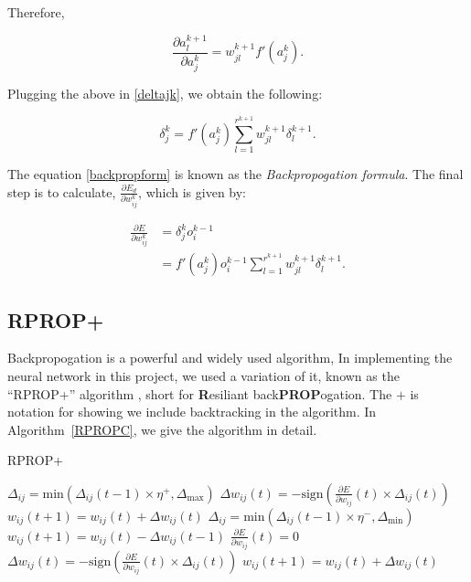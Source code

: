 Therefore,

\begin{equation}
    \frac{\partial a_l^{k+1}}{\partial a_j^k} = w_{jl}^{k+1}f'(a_j^k).
\end{equation}

Plugging the above in \ref{deltajk}, we obtain the following:

\begin{equation}
    \label{backpropform}
    \delta_j^k = f'(a_j^k)\sum^{r^{k+1}}_{l=1}w_{jl}^{k+1}\delta_l^{k+1}.
\end{equation}

The equation \ref{backpropform} is known as the \textit{Backpropogation formula}. The final step is to calculate, $\frac{\partial E_d}{\partial w_{ij}^k}$, which is given by:

\begin{align}
        \frac{\partial E}{\partial w_{ij}^k} &= \delta^k_jo_i^{k-1} \\
        &=f'(a_j^k)o^{k-1}_i \sum^{r^{k+1}}_{l=1}w_{jl}^{k+1}\delta_l^{k+1}.
\end{align}

\subsection{RPROP+}
Backpropogation is a powerful and widely used algorithm, In implementing the neural network in this project, we used a variation of it, known as 
the ``RPROP+'' algorithm \cite{rprop}, short for \textbf{R}esiliant back\textbf{PROP}ogation. The $+$ is notation for showing we include backtracking in the algorithm. In Algorithm~\ref{RPROPC}, 
we give the algorithm in detail. 

\begin{algorithm}[h]
    \caption{RPROP+}\label{RPROPC}
\begin{algorithmic}[1]
    \State $\Delta_{ij} = \text{min} (\Delta_{ij}(t-1)\times \eta^{+},\Delta_{\text{max}})$ 
    \State $\Delta w_{ij}(t) = -\text{sign}\left(\frac{\partial E}{\partial w_{ij}}(t) \times \Delta_{ij}(t)\right)$
    \State $w_{ij}(t+1) = w_{ij}(t) + \Delta w_{ij}(t)$
    \State $\Delta_{ij} = \text{min} (\Delta_{ij}(t-1)\times \eta^{-},\Delta_{\text{min}})$ 
    \State $w_{ij}(t+1) = w_{ij}(t) - \Delta w_{ij}(t-1)$
    \State $\frac{\partial E}{\partial w_{ij}}(t) = 0 $
    \State $\Delta w_{ij}(t) = -\text{sign}\left(\frac{\partial E}{\partial w_{ij}}(t) \times \Delta_{ij}(t)\right)$
    \State $w_{ij}(t+1) = w_{ij}(t) + \Delta w_{ij}(t)$
\EndIf
\EndFor
\end{algorithmic}   
\end{algorithm}

